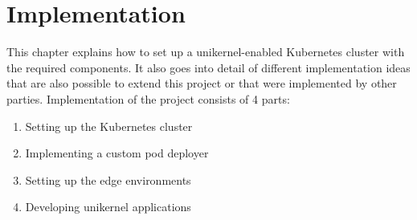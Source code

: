 \chapter{Implementation}\label{chapter:implementation}
This chapter explains how to set up a unikernel-enabled Kubernetes cluster with the required components. It also goes into detail of different implementation ideas that are also possible to extend this project or that were implemented by other parties. Implementation of the project consists of 4 parts:
\begin{enumerate}
\item Setting up the Kubernetes cluster
\item Implementing a custom pod deployer
\item Setting up the edge environments
\item Developing unikernel applications
\end{enumerate}





